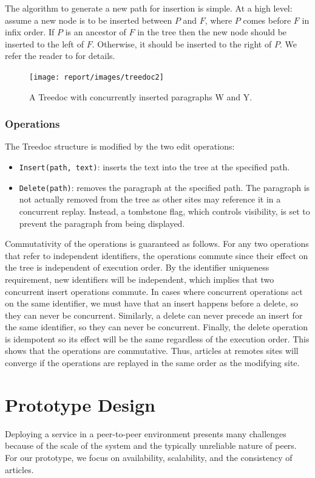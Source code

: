\documentclass[twocolumn]{article}
\begin{document}
The algorithm to generate a new path for insertion is simple. At a high level: assume a new node is to be inserted between $P$ and $F$, where $P$ comes before $F$ in infix order. If $P$ is an ancestor of $F$ in the tree then the new node should be inserted to the left of $F$. Otherwise, it should be inserted to the right of $P$. We refer the reader to \cite{t2} for details.

\begin{figure}[tbh!]
  \centering
  \texttt{[image: report/images/treedoc2]}
  \caption{A Treedoc with concurrently inserted paragraphs W and Y. \label{fig:treedoc_full}}
\end{figure}

\subsubsection{Operations}
The Treedoc structure is modified by the two edit operations:
\begin{itemize}
  \item \texttt{Insert(path, text)}: inserts the text into the tree at the specified path.
  \item \texttt{Delete(path)}: removes the paragraph at the specified path. The paragraph is not actually removed from the tree as other sites may reference it in a concurrent replay. Instead, a tombstone flag, which controls visibility, is set to prevent the paragraph from being displayed.
\end{itemize}

Commutativity of the operations is guaranteed as follows. For any two operations that refer to independent identifiers, the operations commute since their effect on the tree is independent of execution order. By the identifier uniqueness requirement, new identifiers will be independent, which implies that two concurrent insert operations commute. In cases where concurrent operations act on the same identifier, we must have that an insert happens before a delete, so they can never be concurrent. Similarly, a delete can never precede an insert for the same identifier, so they can never be concurrent. Finally, the delete operation is idempotent so its effect will be the same regardless of the execution order. This shows that the operations are commutative. Thus, articles at remotes sites will converge if the operations are replayed in the same order as the modifying site.


\section{Prototype Design}
Deploying a service in a peer-to-peer environment presents many challenges because of the scale of the system and the typically unreliable nature of peers. For our prototype, we focus on availability, scalability, and the consistency of articles.
\end{document}
